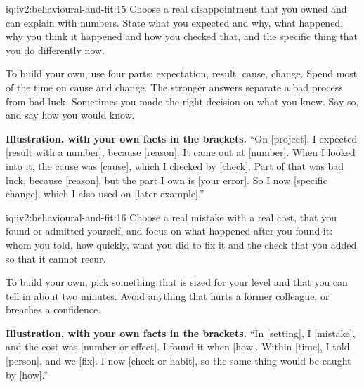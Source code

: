 \begin{solution}{iq:iv2:behavioural-and-fit:15}
Choose a real disappointment that you owned and can explain with numbers. State what you expected and why, what happened, why you think it happened and how you checked that, and the specific thing that you do differently now.

To build your own, use four parts: expectation, result, cause, change. Spend most of the time on cause and change. The stronger answers separate a bad process from bad luck. Sometimes you made the right decision on what you knew. Say so, and say how you would know.

\textbf{Illustration, with your own facts in the brackets.} ``On [project], I expected [result with a number], because [reason]. It came out at [number]. When I looked into it, the cause was [cause], which I checked by [check]. Part of that was bad luck, because [reason], but the part I own is [your error]. So I now [specific change], which I also used on [later example].''

\end{solution}

\begin{solution}{iq:iv2:behavioural-and-fit:16}
Choose a real mistake with a real cost, that you found or admitted yourself, and focus on what happened after you found it: whom you told, how quickly, what you did to fix it and the check that you added so that it cannot recur.

To build your own, pick something that is sized for your level and that you can tell in about two minutes. Avoid anything that hurts a former colleague, or breaches a confidence.

\textbf{Illustration, with your own facts in the brackets.} ``In [setting], I [mistake], and the cost was [number or effect]. I found it when [how]. Within [time], I told [person], and we [fix]. I now [check or habit], so the same thing would be caught by [how].''

\end{solution}

